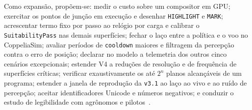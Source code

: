\documentclass[conference]{IEEEtran}
\begin{document}
Como expansão, propõem-se: medir o custo sobre um compositor em GPU;
exercitar os pontos de junção em execução e desenhar \texttt{HIGHLIGHT} e
\texttt{MARK}; acrescentar termo fixo por passo ao relógio por carga e
calibrar o \texttt{SuitabilityPass} nas demais superfícies; fechar o laço entre
a política e o voo no CoppeliaSim; avaliar períodos de \texttt{cooldown}
maiores e filtragem da percepção contra o erro de posição; declarar no modelo a
telemetria dos outros
cinco cenários excepcionais; estender V4 a reduções de resolução e de
frequência de superfícies críticas; verificar exaustivamente os até $2^n$
planos alcançáveis de um programa; estender a janela de reprodução da
\texttt{v3.1} ao laço ao vivo e ao ruído de percepção; aceitar identificadores
Unicode e números negativos; e conduzir o estudo de legibilidade com agrônomos
e pilotos~\cite{rodrigues2017}.
\end{document}
